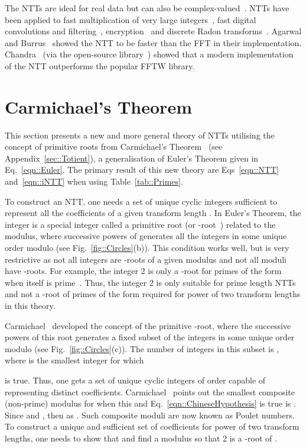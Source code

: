 \documentclass[twocolumn]{IEEEtran}
\newcommand{\eqnTag}{Eq.}
\newcommand{\eqnsTag}{Eqs}
\newcommand{\figTag}{Fig.}
\newcommand{\tabTag}{Table}
\begin{document}
The \acp{NTT} are ideal for real data but can also be complex-valued~\citep{Nussbaumer1976}. \acp{NTT} have been applied to fast multiplication of very large integers~\citep{Schonhage1971}, fast digital convolutions and filtering~\citep{Agarwal1974,Agarwal1974a}, encryption~\citep{Mohan1985} and discrete Radon transforms~\citep{Chandra2010c}. Agarwal and Burrus~\citep{Agarwal1974} showed the \ac{NTT} to be faster than the \ac{FFT} in their implementation. Chandra~\citep{Chandra2010c} (via the open-source library~\citep{Chandra2009b}) showed that a modern implementation of the \ac{NTT} outperforms the popular FFTW library.

\section{Carmichael's Theorem}\label{sec::Carmichael}
This section presents a new and more general theory of \acfp{NTT} utilising the concept of primitive roots from Carmichael's Theorem~\citep{Carmichael1910} (see Appendix~\ref{sec::Totient}), a generalisation of Euler's Theorem given in \eqnTag~\eqref{eqn::Euler}. The primary result of this new theory are \eqnsTag~\eqref{eqn::NTT} and~\eqref{eqn::iNTT} when using \tabTag~\ref{tab::Primes}.

To construct an \ac{NTT}, one needs a set of unique cyclic integers sufficient to represent all the coefficients of a given transform length . In Euler's Theorem, the integer  is a special integer called a primitive root (or -root~\citep{Carmichael1910}) related to the modulus, where successive powers  of  generates all the integers  in some unique order modulo  (see \figTag~\ref{fig::Circles}(b)). This condition works well, but is very restrictive as not all integers are -roots of a given modulus and not all moduli have -roots. For example, the integer 2 is only a -root for primes of the form  when  itself is prime~\citep[pg. 102]{Beiler1966}. Thus, the integer 2 is only suitable for prime length \acp{NTT} and not a -root of primes of the form  required for power of two transform lengths in this theory.

Carmichael~\citep{Carmichael1910} developed the concept of the primitive -root, where the successive powers  of this root generates a fixed subset of the integers  in some unique order modulo  (see \figTag~\ref{fig::Circles}(c)). The number of integers in this subset is , where  is the smallest integer for which

is true. Thus, one gets a set of unique cyclic integers of order  capable of representing  distinct coefficients. Carmichael~\citep{Carmichael1910} points out the smallest composite (non-prime) modulus  for when this and \eqnTag~\eqref{eqn::ChineseHypothesis} is true is . Since  and , then  as . Such composite moduli are now known as Poulet numbers. To construct a unique and sufficient set of coefficients for power of two transform lengths, one needs to show that  and find a modulus  so that 2 is a -root of .
\end{document}
